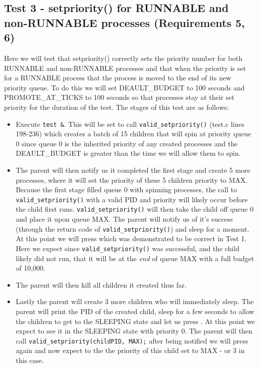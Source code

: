 \documentclass[11pt,letterpaper]{report}
\begin{document}
\subsection*{Test 3 - setpriority() for RUNNABLE and non-RUNNABLE processes (Requirements 5, 6) }
Here we will test that setpriority() correctly sets the priority number for both RUNNABLE and non-RUNNABLE processes and that when the priority is set for a RUNNABLE process
that the process is moved to the end of its new priority queue. To do this we will set DEAULT\_BUDGET to 100 seconds and PROMOTE\_AT\_TICKS to 100 seconds so that processes stay at their set priority for the duration of the test. The stages of this test are as follows:
	\begin{itemize}
		\item Execute {\tt test \&}. This will be set to call {\tt valid\_setpriority()} (test.c lines 198-236) which creates a batch of 15 children that will spin 
			at priority queue 0 since queue 0 
			is the inherited priority of any created processes and the DEAULT\_BUDGET is greater than the time we will allow them to spin.
		
		\item The parent will then notify us it completed the first stage and create 5 more processes, where it will set the priority of these  5 children priority to MAX. Because the first stage filled
			queue 0 with spinning processes, the call to {\tt valid\_setpriority()} with a valid PID and priority will likely occur before the child first runs. {\tt valid\_setpriority()} 
			will then take the child off queue 0
			and place it upon queue MAX. The parent will notify us of it's success (through the return code of {\tt valid\_setpriority()}) and sleep for a moment. At this point we will press 
			which was demonstrated to be correct in Test 1. Here we expect since {\tt valid\_setpriority()} was successful, and the child likely did not run, that it will be at the \emph{end} of queue MAX
			with a full budget of 10,000.
		
		\item The parent will then kill all children it created thus far. 
		
		\item Lastly the parent will create 3 more children who will immediately sleep. The parent will print the PID of the created child, sleep for a few seconds to allow the children to 
			get to the SLEEPING state and let us press . At this point we expect to see it in the SLEEPING state with priority 0. The parent will then call {\tt valid\_setpriority(childPID, MAX);}
			after being notified we will press  again and now expect to the the priority of this child set to MAX - or 3 in this case.
	\end{itemize}
	
\end{document}
